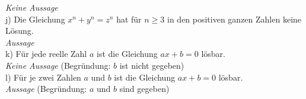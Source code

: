 \textit{Keine Aussage}\\

j) Die Gleichung $x^n + y^n = z^n$ hat für $n \geq 3$ in den positiven ganzen Zahlen keine Lösung.\\

\textit{Aussage}\\

k) Für jede reelle Zahl $a$ ist die Gleichung $ax + b = 0$ lösbar.\\

\textit{Keine Aussage} (Begründung: $b$ ist nicht gegeben)\\

l) Für je zwei Zahlen $a$ und $b$ ist die Gleichung $ax + b = 0$ lösbar.\\

\textit{Aussage} (Begründung: $a$ und $b$ sind gegeben)\\
